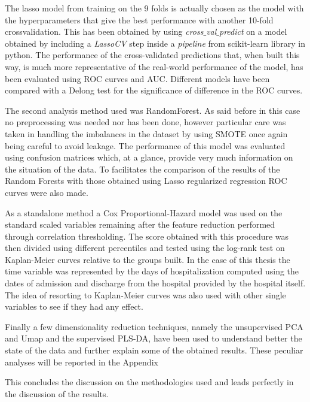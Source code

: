 The lasso model from training on the 9 folds is actually chosen as the model with the hyperparameters that give the best performance with another 10-fold crossvalidation. This has been obtained by using \textit{cross$\_$val$\_$predict} on a model obtained by including a \textit{LassoCV} step inside a \textit{pipeline} from scikit-learn library in python. The performance of the cross-validated predictions that, when built this way, is much more representative of the real-world performance of the model, has been evaluated using ROC curves and AUC.
Different models have been compared with a Delong test\cite{Delong} for the significance of difference in the ROC curves.

The second analysis method used was RandomForest. As said before in this case no preprocessing was needed nor has been done, however particular care was taken in handling the imbalances in the dataset by using SMOTE \cite{SMOTE} once again being careful to avoid leakage. 
The performance of this model was evaluated using confusion matrices which, at a glance, provide very much information on the situation of the data.
To facilitates the comparison of the results of the Random Forests with those obtained using Lasso regularized regression ROC curves were also made.

As a standalone method a Cox Proportional-Hazard model was used on the standard scaled variables remaining after the feature reduction performed through correlation thresholding. 
The score obtained with this procedure was then divided using different percentiles and tested using the log-rank test on Kaplan-Meier curves relative to the groups built.
In the case of this thesis the time variable was represented by the days of hospitalization computed using the dates of admission and discharge from the hospital provided by the hospital itself.
The idea of resorting to Kaplan-Meier curves was also used with other single variables to see if they had any effect. 

Finally a few dimensionality reduction techniques, namely the unsupervised PCA\cite{PCA} and Umap \cite{UMAP} and the supervised PLS-DA\cite{PLSDA}, have been used to understand better the state of the data and further explain some of the obtained results.
These peculiar analyses will be reported in the Appendix 

This concludes the discussion on the methodologies used and leads perfectly in the discussion of the results.


